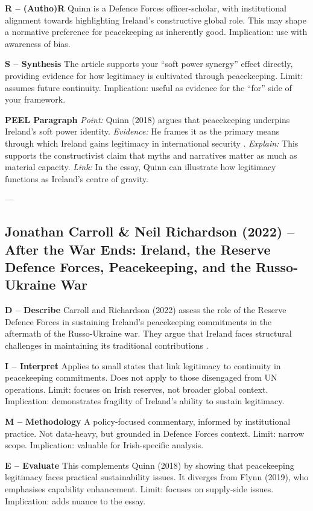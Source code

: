 \textbf{R – (Autho)R}  
Quinn is a Defence Forces officer-scholar, with institutional alignment towards highlighting Ireland’s constructive global role. This may shape a normative preference for peacekeeping as inherently good. Implication: use with awareness of bias.

\textbf{S – Synthesis}  
The article supports your “soft power synergy” effect directly, providing evidence for how legitimacy is cultivated through peacekeeping. Limit: assumes future continuity. Implication: useful as evidence for the “for” side of your framework.

\textbf{PEEL Paragraph}  
\textit{Point:} Quinn (2018) argues that peacekeeping underpins Ireland’s soft power identity.  
\textit{Evidence:} He frames it as the primary means through which Ireland gains legitimacy in international security \parencite{QUINN_2018}.  
\textit{Explain:} This supports the constructivist claim that myths and narratives matter as much as material capacity.  
\textit{Link:} In the essay, Quinn can illustrate how legitimacy functions as Ireland’s centre of gravity.  

---

\subsection*{Jonathan Carroll \& Neil Richardson (2022) – After the War Ends: Ireland, the Reserve Defence Forces, Peacekeeping, and the Russo-Ukraine War}

\textbf{D – Describe}  
Carroll and Richardson (2022) assess the role of the Reserve Defence Forces in sustaining Ireland’s peacekeeping commitments in the aftermath of the Russo-Ukraine war. They argue that Ireland faces structural challenges in maintaining its traditional contributions \parencite{CARROLL_RICHARDSON_2022}.

\textbf{I – Interpret}  
Applies to small states that link legitimacy to continuity in peacekeeping commitments. Does not apply to those disengaged from UN operations. Limit: focuses on Irish reserves, not broader global context. Implication: demonstrates fragility of Ireland’s ability to sustain legitimacy.

\textbf{M – Methodology}  
A policy-focused commentary, informed by institutional practice. Not data-heavy, but grounded in Defence Forces context. Limit: narrow scope. Implication: valuable for Irish-specific analysis.

\textbf{E – Evaluate}  
This complements Quinn (2018) by showing that peacekeeping legitimacy faces practical sustainability issues. It diverges from Flynn (2019), who emphasises capability enhancement. Limit: focuses on supply-side issues. Implication: adds nuance to the essay.

